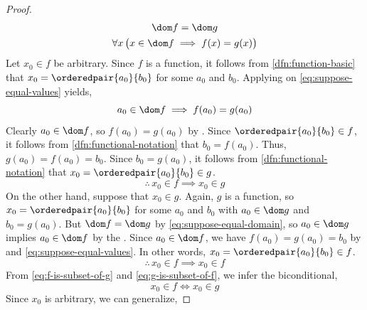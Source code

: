 \begin{proof}
    \begin{gather}
        \dom f = \dom g \label{eq:suppose-equal-domain} \\
        \forall x \, \big( x \in \dom f \implies f(x) = g(x) \big) \label{eq:suppose-equal-values}
    \end{gather}
    Let \( x_{0} \in f\) be arbitrary.
    Since \( f \) is a function, it follows from \cref{dfn:function-basic} that
    \( x_{0} = \orderedpair{a_{0}}{b_{0}} \) for some \( a_{0} \) and \( b_{0} \).
    Applying  on \eqref{eq:suppose-equal-values} yields,
    \begin{equation*}
        a_{0} \in \dom f \implies f(a_{0}) = g(a_{0})
    \end{equation*}
    Clearly \( a_{0} \in \dom f\), so \( f(a_{0}) = g(a_{0}) \) by .
    Since \( \orderedpair{a_{0}}{b_{0}} \in f \), it follows from
    \cref{dfn:functional-notation} that \( b_{0} = f(a_{0}) \). Thus, \( g(a_{0}) = f(a_{0}) = b_{0} \).
    Since \( b_{0} = g(a_{0}) \), it follows from \cref{dfn:functional-notation} that \( x_{0} = \orderedpair{a_{0}}{b_{0}} \in g \).
    \begin{equation}
        \label{eq:f-is-subset-of-g}
        \therefore \, x_{0} \in f \implies x_{0} \in g
    \end{equation}
    On the other hand, suppose that \( x_{0} \in g \). Again, \( g \) is a function, so \( x_{0} = \orderedpair{a_{0}}{b_{0}}\) for some
    \( a_{0} \) and \( b_{0} \) with \( a_{0} \in \dom g \) and \( b_{0} = g(a_{0}) \). But \( \dom f = \dom g \) by \eqref{eq:suppose-equal-domain},
    so \( a_{0} \in \dom g \) implies \( a_{0} \in \dom f \) by the . Since \( a_{0} \in \dom f \), we have
    \( f(a_{0}) = g(a_{0}) = b_{0} \) by  and \eqref{eq:suppose-equal-values}. In other words, \( x_{0} = \orderedpair{a_{0}}{b_{0}} \in f \).
    \begin{equation}
        \label{eq:g-is-subset-of-f}
        \therefore \, x_{0} \in f \implies x_{0} \in f
    \end{equation}
    From \eqref{eq:f-is-subset-of-g} and \eqref{eq:g-is-subset-of-f}, we infer the biconditional,
    \begin{equation*}
        x_{0} \in f \iff x_{0} \in g
    \end{equation*}
    Since \( x_{0} \) is arbitrary, we can generalize,

\end{proof}

